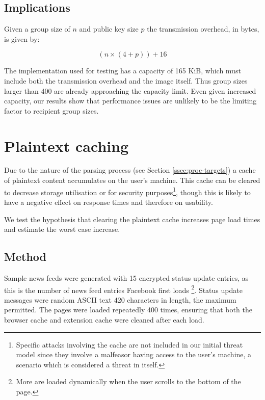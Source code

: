\subsection{Implications}

Given a group size of $n$ and public key size $p$ the transmission overhead, in bytes, is given by:

\begin{equation}
    (n \times (4 + p)) + 16
\end{equation}

The implementation used for testing has a capacity of 165 KiB, which must include both the transmission overhead and the image itself. Thus group sizes larger than 400 are already approaching the capacity limit. Even given increased capacity, our results show that performance issues are unlikely to be the limiting factor to recipient group sizes.


\section{Plaintext caching}
\label{sec:ptextc}

Due to the nature of the parsing process (see Section \ref{ssec:proc-targets}) a cache of plaintext content accumulates on the user's machine. This cache can be cleared to decrease storage utilisation or for security purposes\footnote{Specific attacks involving the cache are not included in our initial threat model since they involve a malfeasor having access to the user's machine, a scenario which is considered a threat in itself.}, though this is likely to have a negative effect on response times and therefore on usability.

We test the hypothesis that clearing the plaintext cache increases page load times and estimate the worst case increase.


\subsection{Method}

Sample news feeds were generated with 15 encrypted status update entries, as this is the number of news feed entries Facebook first loads \footnote{More are loaded dynamically when the user scrolls to the bottom of the page.}. Status update messages were random ASCII text 420 characters in length, the maximum permitted. The pages were loaded repeatedly 400 times, ensuring that both the browser cache and extension cache were cleaned after each load.

